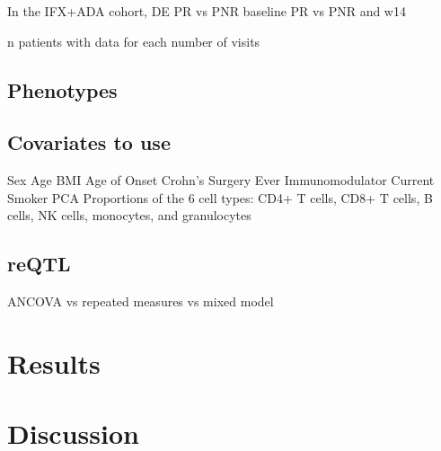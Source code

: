 In the IFX+ADA cohort, 
    DE
    PR vs PNR baseline
    PR vs PNR and w14

n patients with data for each number of visits

\subsection{Phenotypes}

%

\subsection{Covariates to use}

Sex
Age
BMI
Age of Onset
Crohn’s Surgery
Ever Immunomodulator
Current Smoker
PCA
Proportions of the 6 cell types: CD4+ T cells, CD8+ T cells, B cells, NK cells, monocytes, and granulocytes

\subsection{reQTL}



ANCOVA vs repeated measures vs mixed model


\section{Results}

\section{Discussion}

